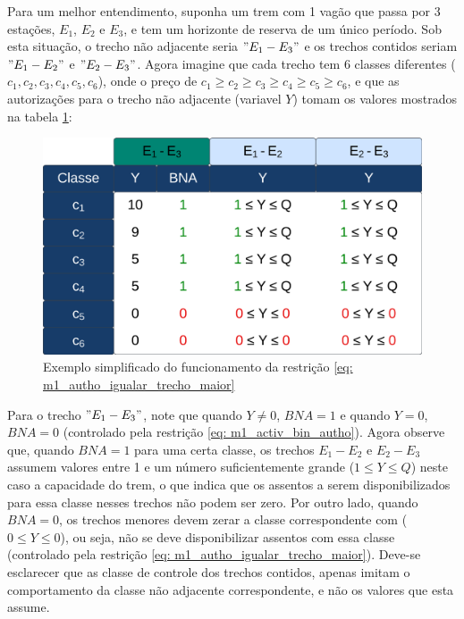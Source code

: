 Para um melhor entendimento, suponha um trem com 1 vagão que passa por 3 estações, $E_1$, $E_2$ e $E_3$, e tem um horizonte de reserva de um único período. Sob esta situação, o trecho não adjacente seria $"E_1-E_3"$ e os trechos contidos seriam $"E_1-E_2"$ e $"E_2-E_3"$. Agora imagine que cada trecho tem 6 classes diferentes ($c_1, c_2, c_3, c_4, c_5, c_6$), onde o preço  de  $c_1 \geq c_2 \geq c_3 \geq c_4 \geq c_5 \geq c_6$, e que as autorizações para o trecho não adjacente (variavel $Y$) tomam os valores mostrados na tabela \ref{fig: exemplo_sip}:

\begin{figure}[!ht]
	\begin{center}
		\includegraphics[scale=0.15]{img/tab_trecho_grande.png}
		\caption{Exemplo simplificado do funcionamento da restrição \ref{eq: m1_autho_igualar_trecho_maior}}
		\label{fig: exemplo_sip}
	\end{center}
\end{figure}

Para o trecho $"E_1-E_3"$, note que quando $Y \neq 0$, $BNA = 1$ e quando $Y = 0$, $BNA = 0$ (controlado pela restrição \ref{eq: m1_activ_bin_autho}). Agora observe que, quando $ BNA = 1$ para uma certa classe, os trechos $E_1-E_2$ e $E_2-E_3$ assumem valores entre 1 e um número suficientemente grande ($1 \le Y \leq Q$) neste caso a capacidade do trem, o que indica que os assentos a serem disponibilizados para essa classe nesses trechos não podem ser zero. Por outro lado, quando $BNA = 0$, os trechos menores devem zerar a classe correspondente com ($0 \leq Y \leq 0$), ou seja, não se deve disponibilizar assentos com essa classe (controlado pela restrição \ref{eq: m1_autho_igualar_trecho_maior}). Deve-se esclarecer que as classe de controle dos trechos contidos, apenas imitam o comportamento da classe não adjacente correspondente, e não os valores que esta assume.

